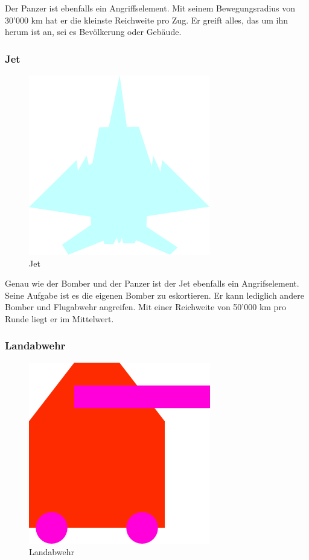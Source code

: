 \documentclass[ngerman, 12pt, pdftex]{scrartcl}[2006/07/30]
\begin{document}
Der Panzer ist ebenfalls ein Angriffselement.
Mit seinem Bewegungsradius von 30'000 km hat er die kleinste Reichweite pro Zug. Er greift alles, das um ihn herum ist an, sei es Bevölkerung oder Gebäude. 

\newpage

\subsubsection{Jet}

\begin{figure}[h]
\centering
\includegraphics[scale=1.8]{spiel/Flugzeug.png}
\caption{Jet}
\end{figure}

Genau wie der Bomber und der Panzer ist der Jet ebenfalls ein Angrifselement.
Seine Aufgabe ist es die eigenen Bomber zu eskortieren. Er kann lediglich andere Bomber und Flugabwehr angreifen. Mit einer Reichweite von 50'000 km pro Runde liegt er im Mittelwert.

\subsubsection{Landabwehr}

\begin{figure}[h]
\centering
\includegraphics[scale=18]{spiel/Landabwehr.png}
\caption{Landabwehr}
\end{figure}
\end{document}
